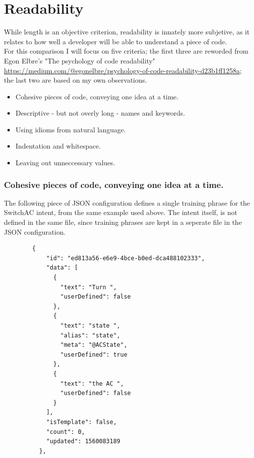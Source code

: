 \section{Readability}

While length is an objective criterion, readability is innately more subjetive, as it relates to how well a developer will be able to understand a piece of code.\\
For this comparison I will focus on five criteria; the first three are reworded from Egon Elbre's "The psychology of code readability" \citeNeeded \url{https://medium.com/@egonelbre/psychology-of-code-readability-d23b1ff1258a}; the last two are based on my own observations.
\begin{itemize}
    \item Cohesive pieces of code, conveying one idea at a time.
    \item Descriptive - but not overly long - names and keywords.
    \item Using idioms from natural language.
    \item Indentation and whitespace.
    \item Leaving out unneccessary values.
\end{itemize}

\subsubsection{Cohesive pieces of code, conveying one idea at a time.}

The following piece of JSON configuration defines a single training phrase for the SwitchAC intent, from the same example used above. The intent itself, is not defined in the same file, since training phrases are kept in a seperate file in the JSON configuration.
\begin{samepage}
    \begin{verbatim}
        {
            "id": "ed813a56-e6e9-4bce-b0ed-dca488102333",
            "data": [
              {
                "text": "Turn ",
                "userDefined": false
              },
              {
                "text": "state ",
                "alias": "state",
                "meta": "@ACState",
                "userDefined": true
              },
              {
                "text": "the AC ",
                "userDefined": false
              }
            ],
            "isTemplate": false,
            "count": 0,
            "updated": 1560083189
          },
    \end{verbatim}
\end{samepage}

